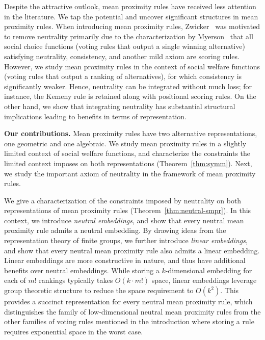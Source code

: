 \documentclass[prodmode]{acmsmall-ec14}
\begin{document}
Despite the attractive outlook, mean proximity rules have received less attention in the literature. We tap the potential and uncover significant structures in mean proximity rules. When introducing mean proximity rules, Zwicker~ was motivated to remove neutrality primarily due to the characterization by Myerson~ that all social choice functions (voting rules that output a single winning alternative) satisfying neutrality, consistency, and another mild axiom are scoring rules. However, we study mean proximity rules in the context of social welfare functions (voting rules that output a ranking of alternatives), for which consistency is significantly weaker. Hence, neutrality can be integrated without much loss; for instance, the Kemeny rule is retained along with positional scoring rules. On the other hand, we show that integrating neutrality has substantial structural implications leading to benefits in terms of representation.

\medskip\noindent
\textbf{Our contributions.} Mean proximity rules have two alternative representations, one geometric and one algebraic. We study mean proximity rules in a slightly limited context of social welfare functions, and characterize the constraints the limited context imposes on both representations (Theorem~\ref{thm:symm}). Next, we study the important axiom of neutrality in the framework of mean proximity rules. 

We give a characterization of the constraints imposed by neutrality on both representations of mean proximity rules (Theorem~\ref{thm:neutral-smpr}). In this context, we introduce \emph{neutral embeddings}, and show that every neutral mean proximity rule admits a neutral embedding. By drawing ideas from the representation theory of finite groups, we further introduce \emph{linear embeddings}, and show that every neutral mean proximity rule also admits a linear embedding. Linear embeddings are more constructive in nature, and thus have additional benefits over neutral embeddings. While storing a $k$-dimensional embedding for each of $m!$ rankings typically takes $O(k \cdot m!)$ space, linear embeddings leverage group theoretic structure to reduce the space requirement to $O(k^2)$. This provides a succinct representation for every neutral mean proximity rule, which distinguishes the family of low-dimensional neutral mean proximity rules from the other families of voting rules mentioned in the introduction where storing a rule requires exponential space in the worst case. 
\end{document}
